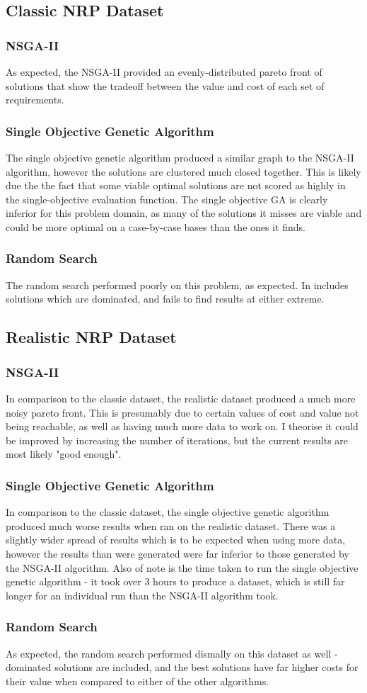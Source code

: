 \documentclass[12pt]{article}
\begin{document}
\subsection{Classic NRP Dataset}
\subsubsection{NSGA-II}
As expected, the NSGA-II provided an evenly-distributed pareto front of solutions that show the tradeoff between the value and cost of each set of requirements.

\subsubsection{Single Objective Genetic Algorithm}
The single objective genetic algorithm produced a similar graph to the NSGA-II algorithm, however the solutions are clustered much closed together. This is likely due the the fact that some viable optimal solutions are not scored as highly in the single-objective evaluation function. The single objective GA is clearly inferior for this problem domain, as many of the solutions it misses are viable and could be more optimal on a case-by-case bases than the ones it finds.

\subsubsection{Random Search}
The random search performed poorly on this problem, as expected. In includes solutions which are dominated, and fails to find results at either extreme.

\subsection{Realistic NRP Dataset}
\subsubsection{NSGA-II}
In comparison to the classic dataset, the realistic dataset produced a much more noisy pareto front. This is presumably due to certain values of cost and value not being reachable, as well as having much more data to work on. I theorise it could be improved by increasing the number of iterations, but the current results are most likely "good enough".

\subsubsection{Single Objective Genetic Algorithm}
In comparison to the classic dataset, the single objective genetic algorithm produced much worse results when ran on the realistic dataset. There was a slightly wider spread of results which is to be expected when using more data, however the results than were generated were far inferior to those generated by the NSGA-II algorithm. Also of note is the time taken to run the single objective genetic algorithm - it took over 3 hours to produce a dataset, which is still far longer for an individual run than the NSGA-II algorithm took.

\subsubsection{Random Search}
As expected, the random search performed dismally on this dataset as well - dominated solutions are included, and the best solutions have far higher costs for their value when compared to either of the other algorithms.
\end{document}
